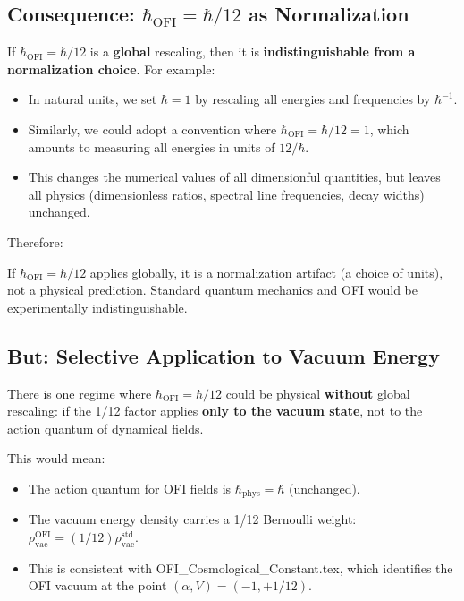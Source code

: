 \documentclass[12pt]{article}
\theoremstyle{definition}
\newcommand{\rhovac}{\rho_{\mathrm{vac}}}
\begin{document}
\subsection{Consequence: $\hbar_{\mathrm{OFI}} = \hbar/12$ as Normalization}

If $\hbar_{\mathrm{OFI}} = \hbar/12$ is a \textbf{global} rescaling, then it is
\textbf{indistinguishable from a normalization choice}. For example:
\begin{itemize}
  \item In natural units, we set $\hbar = 1$ by rescaling all energies and
    frequencies by $\hbar^{-1}$.
  \item Similarly, we could adopt a convention where $\hbar_{\mathrm{OFI}} = \hbar/12 = 1$,
    which amounts to measuring all energies in units of $12/\hbar$.
  \item This changes the numerical values of all dimensionful quantities, but leaves
    all physics (dimensionless ratios, spectral line frequencies, decay widths) unchanged.
\end{itemize}

Therefore:
\begin{tcolorbox}[resultbox, title=Key Insight]
If $\hbar_{\mathrm{OFI}} = \hbar/12$ applies globally, it is a normalization artifact
(a choice of units), not a physical prediction. Standard quantum mechanics and OFI
would be experimentally indistinguishable.
\end{tcolorbox}

\subsection{But: Selective Application to Vacuum Energy}

There is one regime where $\hbar_{\mathrm{OFI}} = \hbar/12$ could be physical
\textbf{without} global rescaling: if the 1/12 factor applies \textbf{only to the
vacuum state}, not to the action quantum of dynamical fields.

This would mean:
\begin{itemize}
  \item The action quantum for OFI fields is $\hbar_{\mathrm{phys}} = \hbar$ (unchanged).
  \item The vacuum energy density carries a 1/12 Bernoulli weight:
    $\rhovac^{\mathrm{OFI}} = (1/12) \rhovac^{\mathrm{std}}$.
  \item This is consistent with OFI_Cosmological_Constant.tex, which identifies
    the OFI vacuum at the point $(\alpha, V) = (-1, +1/12)$.
\end{itemize}
\end{document}
